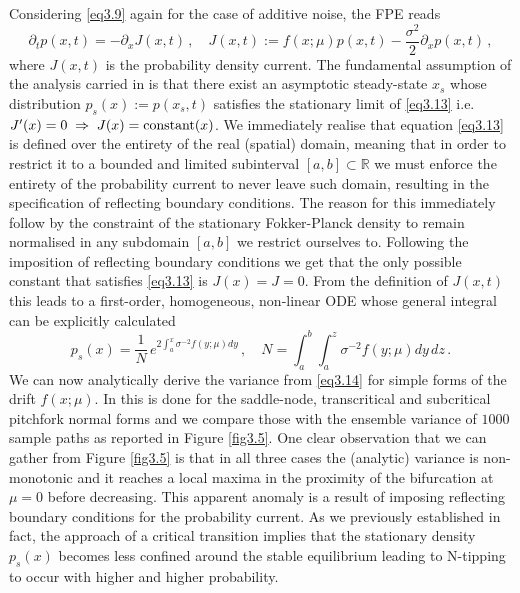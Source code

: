\documentclass[../main.tex]{subfiles}
\begin{document}
Considering \eqref{eq3.9} again for the case of additive noise, the FPE reads
\begin{equation}\label{eq3.13}
     \partial_{t}p(x,t) = -\partial_{x}J(x,t)\,,\quad J(x,t):= f(x;\mu)p(x,t) - \frac{\sigma^{2}}{2}\partial_{x}p(x,t) \,,
\end{equation}
where $J(x,t)$ is the probability density current.
The fundamental assumption of the analysis carried in \cite{Kuehn11} is that there exist an asymptotic steady-state $x_{s}$ whose distribution $p_{s}(x):=p(x_{s},t)$ satisfies the stationary limit of \eqref{eq3.13} i.e. $J'(x) = 0\;\Rightarrow\; J(x) = \text{constant}(x)$. 
We immediately realise that equation \eqref{eq3.13} is defined over the entirety of the real (spatial) domain, meaning that in order to restrict it to a bounded and limited subinterval $[a,b]\subset \mathbb{R}$ we must enforce the entirety of the probability current to never leave such domain, resulting in the specification of reflecting boundary conditions. 
The reason for this immediately follow by the constraint of the stationary Fokker-Planck density to remain normalised in any subdomain $[a,b]$ we restrict ourselves to.
Following the imposition of reflecting boundary conditions we get that the only possible constant that satisfies \eqref{eq3.13} is $J(x)=J=0$. From the definition of $J(x,t)$ this leads to a first-order, homogeneous, non-linear ODE whose general integral can be explicitly calculated
\begin{equation}\label{eq3.14}
     p_{s}(x)=\frac{1}{N}\,e^{2 \int_{a}^{x}\sigma^{-2}f(y;\mu)dy}\,,\quad N = \int_{a}^{b}\int_{a}^{z}\sigma^{-2}f(y;\mu)dy\,dz\,.
\end{equation}
We can now analytically derive the variance from \eqref{eq3.14} for simple forms of the drift $f(x;\mu)$. In \cite{Kuehn11} this is done for the saddle-node, transcritical and subcritical pitchfork normal forms and we compare those with the ensemble variance of $1000$ sample paths as reported in Figure \ref{fig3.5}.
One clear observation that we can gather from Figure \ref{fig3.5} is that in all three cases the (analytic) variance is non-monotonic and it reaches a local maxima in the proximity of the bifurcation at $\mu=0$ before decreasing. 
This apparent anomaly is a result of imposing reflecting boundary conditions for the probability current.
As we previously established in fact, the approach of a critical transition implies that the stationary density $p_{s}(x)$ becomes less confined around the stable equilibrium leading to N-tipping to occur with higher and higher probability.
\end{document}
